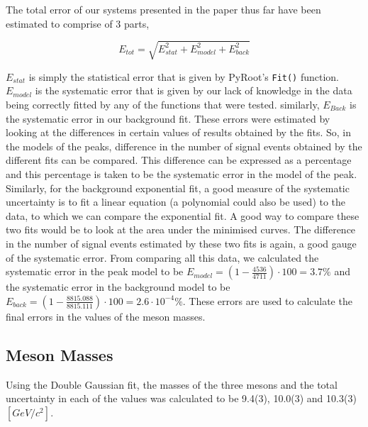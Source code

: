 The total error of our systems presented in the paper thus far have been estimated to comprise of 3 parts,

\begin{equation*}
    E_{tot} = \sqrt{E_{stat}^2 + E_{model}^2 + E_{back}^2}
\end{equation*}

$E_{stat}$ is simply the statistical error that is given by PyRoot's \verb|Fit()| function. $E_{model}$ is the systematic error that is given by our lack of knowledge in the data being correctly fitted by any of the functions that were tested. similarly, $E_{Back}$ is the systematic error in our background fit. These errors were estimated by looking at the differences in certain values of results obtained by the fits. So, in the models of the peaks, difference in the number of signal events obtained by the different fits can be compared. This difference can be expressed as a percentage and this percentage is taken to be the systematic error in the model of the peak. Similarly, for the background exponential fit, a good measure of the systematic uncertainty is to fit a linear equation (a polynomial could also be used) to the data, to which we can compare the exponential fit. A good way to compare these two fits would be to look at the area under the minimised curves. The difference in the number of signal events estimated by these two fits is again, a good gauge of the systematic error. From comparing all this data, we calculated the systematic error in the peak model to be $E_{model} =(1- \frac{4536}{4711})\cdot 100 = 3.7\%$ and the systematic error in the background model to be $E_{back} =(1- \frac{8815.088}{8815.111})\cdot 100 = 2.6\cdot 10^{-4}\%$. These errors are used to calculate the final errors in the values of the meson masses. \\

\subsection*{Meson Masses}

Using the Double Gaussian fit, the masses of the three mesons and the total uncertainty in each of the values was calculated to be 9.4(3), 10.0(3) and 10.3(3) $[GeV/c^2]$.\\
